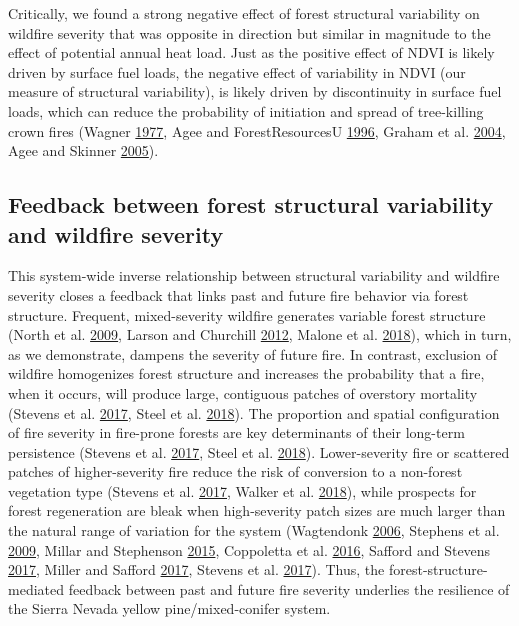 \documentclass[twoside,12pt,final]{ucthesis-CA2012}
\begin{document}
\begin{ucmainmatter}
Critically, we found a strong negative effect of forest structural
variability on wildfire severity that was opposite in direction but
similar in magnitude to the effect of potential annual heat load. Just
as the positive effect of NDVI is likely driven by surface fuel loads,
the negative effect of variability in NDVI (our measure of structural
variability), is likely driven by discontinuity in surface fuel loads,
which can reduce the probability of initiation and spread of
tree-killing crown fires (Wagner
\protect\hyperlink{ref-wagner1977}{1977}, Agee and ForestResourcesU
\protect\hyperlink{ref-agee1996}{1996}, Graham et al.
\protect\hyperlink{ref-graham2004}{2004}, Agee and Skinner
\protect\hyperlink{ref-agee2005}{2005}).

\subsection{Feedback between forest structural variability and wildfire
severity}\label{feedback-between-forest-structural-variability-and-wildfire-severity}

This system-wide inverse relationship between structural variability and
wildfire severity closes a feedback that links past and future fire
behavior via forest structure. Frequent, mixed-severity wildfire
generates variable forest structure (North et al.
\protect\hyperlink{ref-north2009a}{2009}, Larson and Churchill
\protect\hyperlink{ref-larson2012}{2012}, Malone et al.
\protect\hyperlink{ref-malone2018}{2018}), which in turn, as we
demonstrate, dampens the severity of future fire. In contrast, exclusion
of wildfire homogenizes forest structure and increases the probability
that a fire, when it occurs, will produce large, contiguous patches of
overstory mortality (Stevens et al.
\protect\hyperlink{ref-stevens2017}{2017}, Steel et al.
\protect\hyperlink{ref-steel2018}{2018}). The proportion and spatial
configuration of fire severity in fire-prone forests are key
determinants of their long-term persistence (Stevens et al.
\protect\hyperlink{ref-stevens2017}{2017}, Steel et al.
\protect\hyperlink{ref-steel2018}{2018}). Lower-severity fire or
scattered patches of higher-severity fire reduce the risk of conversion
to a non-forest vegetation type (Stevens et al.
\protect\hyperlink{ref-stevens2017}{2017}, Walker et al.
\protect\hyperlink{ref-walker2018}{2018}), while prospects for forest
regeneration are bleak when high-severity patch sizes are much larger
than the natural range of variation for the system (Wagtendonk
\protect\hyperlink{ref-wagtendonk2006}{2006}, Stephens et al.
\protect\hyperlink{ref-stephens2009}{2009}, Millar and Stephenson
\protect\hyperlink{ref-millar2015}{2015}, Coppoletta et al.
\protect\hyperlink{ref-coppoletta2016}{2016}, Safford and Stevens
\protect\hyperlink{ref-safford2017}{2017}, Miller and Safford
\protect\hyperlink{ref-miller2017}{2017}, Stevens et al.
\protect\hyperlink{ref-stevens2017}{2017}). Thus, the
forest-structure-mediated feedback between past and future fire severity
underlies the resilience of the Sierra Nevada yellow pine/mixed-conifer
system.


\end{ucmainmatter}
\end{document}
